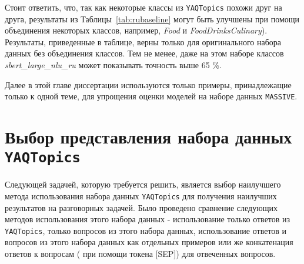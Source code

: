 \begin{table*}
\centering
\caption{Accuracy(f1) of the Russian baseline models for different versions of \texttt{YAQTopics}. \textbf{Q} means questions, \textbf{A} means answers, \textbf{Q and A} means treating questions and answers as separate examples, and \textbf{Q [SEP] A} means concatenation  of every questions with the corresponding answer(if that answer exist) using [SEP] token. Full means we have used singlelabel and multilabel data. Otherwise we have used only singlelabel data/  Backbone: \textit{sbert\_large\_nlu\_ru}.}
\end{table*}

Стоит ответить, что, так как некоторые классы из \texttt{YAQTopics} похожи друг на друга, результаты из Таблицы~\ref{tab:rubaseline} могут быть улучшены при помощи объединения некоторых классов, например, \textit{Food} и \textit{FoodDrinksCulinary}). Результаты, приведенные в таблице, верны только для оригинального набора данных без объединения классов. Тем не менее, даже на этом наборе классов \textit{sbert\_large\_nlu\_ru} может показывать точность выше 65 \%.


Далее в этой главе диссертации используются только примеры, принадлежащие только к одной теме, для упрощения оценки моделей на наборе данных \texttt{MASSIVE}.

\section{Выбор представления набора данных \texttt{YAQTopics}} 

Следующей задачей, которую требуется решить, является выбор наилучшего метода использования набора данных \texttt{YAQTopics} для получения наилучших результатов на разговорных задачей. Было проведено сравнение следующих методов использования этого набора данных - использование только ответов из \texttt{YAQTopics}, только вопросов из этого набора данных, использование ответов и вопросов из этого набора данных как отдельных примеров или же конкатенация ответов к вопросам ( при помощи токена [SEP]) для отвеченных вопросов.

